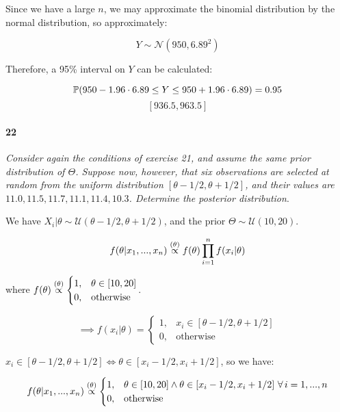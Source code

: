 \documentclass[a4paper]{article}
\begin{document}
                Since we have a large $n$, we may approximate the binomial
                distribution by the normal distribution, so approximately:

                \[
                    Y \sim \mathcal{N}(950, 6.89^2)
                \]

                Therefore, a 95\% interval on $Y$ can be calculated:

                \[
                    \mathbb{P}(950 - 1.96 \cdot 6.89 \leq Y \leq 950 + 1.96 \cdot
                    6.89) = 0.95
                \]
                \[
                    [936.5, 963.5]
                \]

            \paragraph{22}
            \textit{Consider again the conditions of exercise 21, and assume the
            same prior distribution of $\Theta$. Suppose now, however, that six
            observations are selected at random from the uniform distribution
            $[\theta - 1/2, \theta + 1/2]$, and their values are $11.0, 11.5,
            11.7, 11.1, 11.4, 10.3$. Determine the posterior distribution}.

                We have $X_i | \theta \sim \mathcal{U}(\theta - 1/2, \theta +
                1/2)$, and the prior $\Theta \sim \mathcal{U}(10, 20)$.

                \[
                    f(\theta | x_1, ..., x_n) \stackrel{({\theta})}{\propto} f(\theta)
                    \prod_{i=1}^n f(x_i | \theta)
                \]

                where $f(\theta) \stackrel{({\theta})}{\propto} \begin{cases}1, & \theta \in
                [10, 20] \\ 0, &\text{otherwise}\end{cases}$.

                \[
                    \implies f(x_i | \theta) = \begin{cases}1, & x_i \in [\theta
                    - 1/2, \theta + 1/2] \\ 0, & \text{otherwise}\end{cases}
                \]

                $x_i \in [\theta - 1/2, \theta + 1/2] \iff \theta \in [x_i -
                1/2, x_i + 1/2]$, so we have:

                \[
                    f(\theta | x_1, ..., x_n) \stackrel{({\theta})}{\propto} \begin{cases}1, &
                    \theta \in [10, 20] \land \theta \in [x_i - 1/2, x_i + 1/2]
                    \,\,\forall\, i = 1, ..., n \\ 0, & \text{otherwise}\end{cases}
                \]
\end{document}
